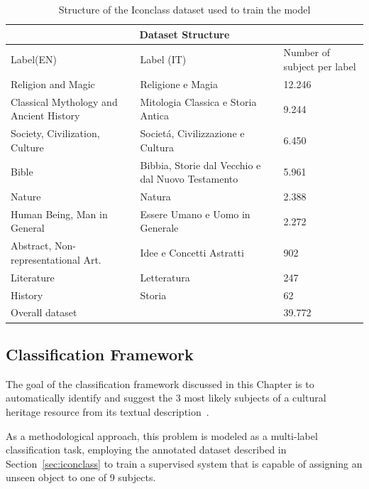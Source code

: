 \documentclass[epsfig,a4paper,12pt,titlepage]{book}
\begin{document}
\begin{table}[h!]
\centering
\begin{adjustbox}{width=\textwidth}
\begin{tabular}{|p{4.5cm}||p{4.5cm}|p{5.0cm}|} \hline

  \hline
  \multicolumn{3}{|c|}{Dataset Structure} \\
  \hline
    Label(EN)  & Label (IT) & Number of subject per label \\ \hline
    Religion and Magic& Religione e Magia	& 12.246 \\ \hline
    Classical Mythology and Ancient History& Mitologia Classica e Storia Antica	& 9.244\\ \hline
    Society, Civilization, Culture &Societ\'a, Civilizzazione e Cultura & 6.450 \\ \hline
    Bible & Bibbia, Storie dal Vecchio e dal Nuovo Testamento & 5.961 \\ \hline
    Nature & Natura &	2.388 \\ \hline
    Human Being, Man in General	& Essere Umano e Uomo in Generale & 2.272 \\ \hline
    Abstract, Non-representational Art.	& Idee e Concetti Astratti & 902\\ \hline
    Literature &	Letteratura & 247\\ \hline
    History	& Storia & 62\\ \hline \hline
    Overall dataset & &	39.772\\ \hline
    \hline
\end{tabular}
\end{adjustbox}
    \caption{Structure of the Iconclass dataset used to train the model}
		\label{tab:dataset_coher_structure}       %
\end{table}
\subsection{Classification Framework}
The goal of the classification framework discussed in this Chapter is to automatically identify and suggest the 3 most likely subjects of a cultural heritage resource from its textual description~\cite{app8101768}. 

As a methodological approach, this problem is modeled as a multi-label classification task, employing the annotated dataset described in Section~\ref{sec:iconclass} to train a supervised system that is capable of assigning an unseen object to one of 9 subjects. 
\end{document}
